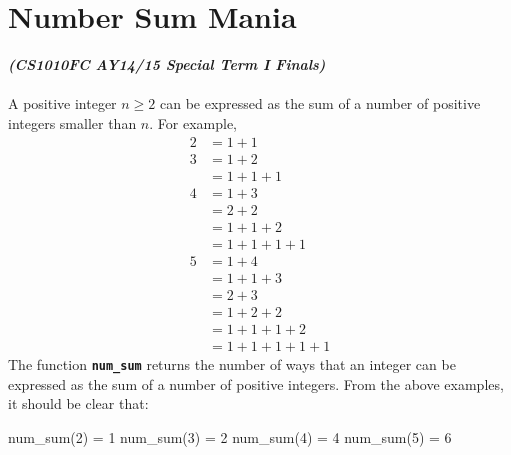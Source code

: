\newpage

\section{Number Sum Mania}
\textbf{\textit{(CS1010FC AY14/15 Special Term I Finals)}} \\ \\
A positive integer $n \ge 2$ can be expressed as the sum of a number of positive integers smaller
than $n$. For example,
\begin{align*}
2 &= 1+1 \\
3 &= 1+2 \\
&= 1+1+1 \\
4 &= 1+3 \\
&= 2+2 \\
&= 1+1+2 \\
&= 1+1+1+1 \\
5 &= 1+4 \\
&= 1+1+3 \\
&= 2+3 \\
&= 1+2+2 \\
&= 1+1+1+2 \\
&= 1+1+1+1+1
\end{align*}
The function \texttt{\bfseries num\_sum} returns the number of ways that an integer can be expressed as the sum
of a number of positive integers. From the above examples, it should be clear that:
\begin{python}
num_sum(2) = 1
num_sum(3) = 2
num_sum(4) = 4
num_sum(5) = 6
\end{python}

